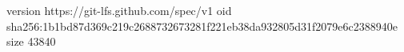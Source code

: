 version https://git-lfs.github.com/spec/v1
oid sha256:1b1bd87d369c219c2688732673281f221eb38da932805d31f2079e6c2388940e
size 43840
